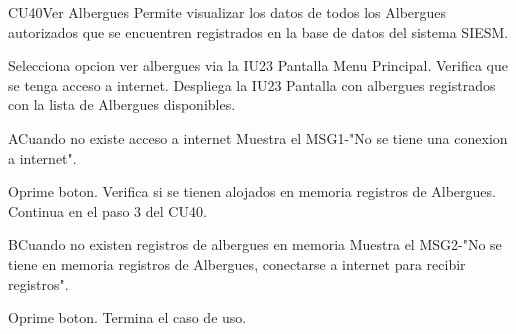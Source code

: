 \begin{UseCase}{CU40}{Ver Albergues}{
		Permite visualizar los datos de todos los Albergues autorizados que se encuentren registrados en la base de datos del sistema SIESM.\\
		
}
	
\end{UseCase}



\begin{UCtrayectoria}
	\item \UCactor Selecciona opcion ver albergues via la IU23 Pantalla Menu Principal.
	\UCpaso Verifica que se tenga acceso a internet.
	\UCpaso Despliega la IU23 Pantalla con albergues registrados con la lista de Albergues disponibles.
\end{UCtrayectoria}


\begin{UCtrayectoriaA}{A}{Cuando no existe acceso a internet}
	\UCpaso Muestra el MSG1-"No se tiene una conexion a internet".
	\item \UCactor Oprime boton.
	\UCpaso Verifica si se tienen alojados en memoria registros de Albergues.
	\UCpaso Continua en el paso 3 del CU40.
\end{UCtrayectoriaA}

\begin{UCtrayectoriaA}{B}{Cuando no existen registros de albergues en memoria}
	\UCpaso Muestra el MSG2-"No se tiene en memoria registros de Albergues, conectarse a internet para recibir registros".	
	\item \UCactor Oprime boton.
	\UCpaso[] Termina el caso de uso.
\end{UCtrayectoriaA}